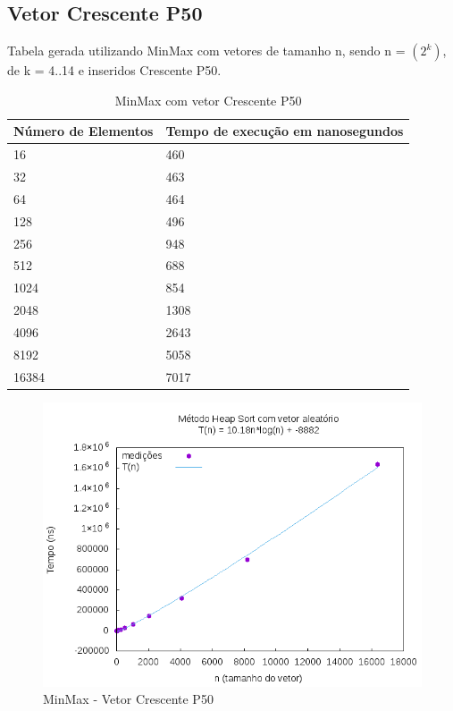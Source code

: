 \documentclass[12pt,a4paper,twoside]{report}
\begin{document}
\subsection{Vetor Crescente P50}
Tabela gerada utilizando MinMax com vetores de tamanho n, sendo n = $(2^k)$, de k = 4..14 e inseridos Crescente P50.
\begin{table}[H]
\centering
\caption{MinMax com vetor Crescente P50}
\label{my-label}
\begin{tabular}{|l|l|}
\hline
\multicolumn{1}{|c|}{\textbf{Número de Elementos}} & \multicolumn{1}{c|}{\textbf{Tempo de execução em nanosegundos}} \\ \hline
16 & 460 \\ \hline
32 & 463 \\ \hline
64 & 464 \\ \hline
128 & 496 \\ \hline
256 & 948 \\ \hline
512 & 688 \\ \hline
1024 & 854 \\ \hline
2048 & 1308 \\ \hline
4096 & 2643 \\ \hline
8192 & 5058 \\ \hline
16384 & 7017 \\ \hline
\end{tabular}
\end{table}

\begin{figure}[H]
    \centering
    \includegraphics[width=0.7\linewidth]{graficos/HeapSort/vIntAleatorio/vIntAleatorio.png}
  \caption{MinMax - Vetor Crescente P50}
\end{figure}
\end{document}
